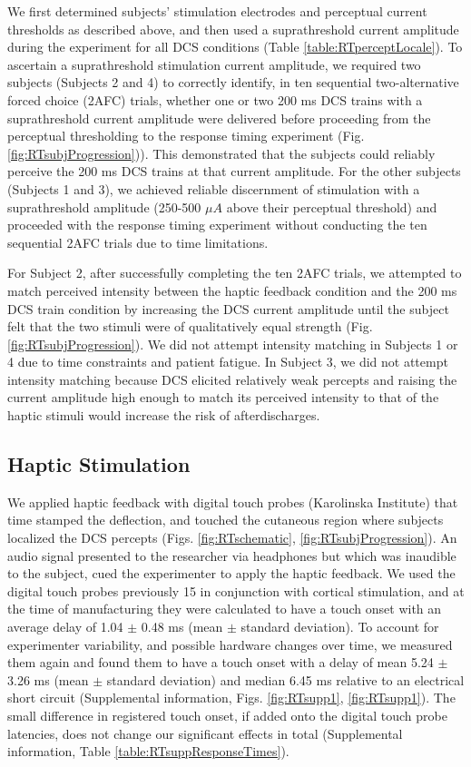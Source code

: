  We first determined subjects’ stimulation electrodes and perceptual current thresholds as described above, and then used a suprathreshold current amplitude during the experiment for all DCS conditions (Table \ref{table:RTperceptLocale}). To ascertain a suprathreshold stimulation current amplitude, we required two subjects (Subjects 2 and 4) to correctly identify, in ten sequential two-alternative forced choice (2AFC) trials, whether one or two 200 ms DCS trains with a suprathreshold current amplitude were delivered before proceeding from the perceptual thresholding to the response timing experiment (Fig. \ref{fig:RTsubjProgression})). This demonstrated that the subjects could reliably perceive the 200 ms DCS trains at that current amplitude. For the other subjects (Subjects 1 and 3), we achieved reliable discernment of stimulation with a suprathreshold amplitude (250-500 $ \mu A  $ above their perceptual threshold) and proceeded with the response timing experiment without conducting the ten sequential 2AFC trials due to time limitations.
 
 For Subject 2, after successfully completing the ten 2AFC trials, we attempted to match perceived intensity between the haptic feedback condition and the 200 ms DCS train condition by increasing the DCS current amplitude until the subject felt that the two stimuli were of qualitatively equal strength (Fig. \ref{fig:RTsubjProgression}). We did not attempt intensity matching in Subjects 1 or 4 due to time constraints and patient fatigue. In Subject 3, we did not attempt intensity matching because DCS elicited relatively weak percepts and raising the current amplitude high enough to match its perceived intensity to that of the haptic stimuli would increase the risk of afterdischarges.
 
 \subsection{Haptic Stimulation}
 We applied haptic feedback with digital touch probes (Karolinska Institute) that time stamped the deflection, and touched the cutaneous region where subjects localized the DCS percepts (Figs. \ref{fig:RTschematic}, \ref{fig:RTsubjProgression}). An audio signal presented to the researcher via headphones but which was inaudible to the subject, cued the experimenter to apply the haptic feedback. We used the digital touch probes previously \cite{Collins2016} 15 in conjunction with cortical stimulation, and at the time of manufacturing they were calculated to have a touch onset with an average delay of 1.04 	$\pm$ 0.48 ms (mean  $\pm$ standard deviation). To account for experimenter variability, and possible hardware changes over time, we measured them again and found them to have a touch onset with a delay of mean 5.24 	$\pm$ 3.26 ms (mean 	$\pm$ standard deviation) and median 6.45 ms relative to an electrical short circuit (Supplemental information, Figs. \ref{fig:RTsupp1}, \ref{fig:RTsupp1}). The small difference in registered touch onset, if added onto the digital touch probe latencies, does not change our significant effects in total (Supplemental information, Table \ref{table:RTsuppResponseTimes}). 
  
